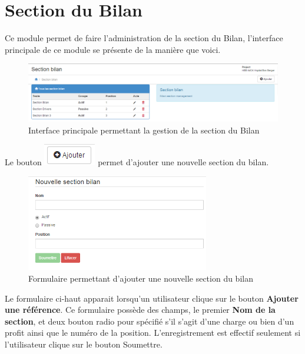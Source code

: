 \documentclass[12pt,a4paper]{report}
\begin{document}
\newpage
\section{Section du Bilan}
Ce module permet de faire l'administration de la section du Bilan, l'interface principale de ce module se présente de la manière que voici.

\begin{figure}[h]
\begin{center}
\includegraphics[width=14cm]{pic/SectionBilan.png}
\end{center}
\caption{Interface principale permettant la gestion de la section du Bilan}
\label{Interface principale permettant la gestion de la section du Bilan}
\end{figure}

Le bouton \includegraphics[scale=0.7]{pic/AddNewStore.png} permet d'ajouter une nouvelle section du bilan.

\begin{figure}[h]
\begin{center}
\includegraphics[width=8cm]{pic/NouvelleSectionBilan.png}
\end{center}
\caption{Formulaire permettant d'ajouter une nouvelle section du bilan}
\label{Formulaire permettant d'ajouter une nouvelle section du bilan}
\end{figure}

Le formulaire ci-haut apparait lorsqu'un utilisateur clique sur le bouton \textbf{Ajouter une référence}. Ce formulaire possède des champs, le premier \textbf{Nom de la section}, et deux bouton radio pour spécifié s'il s'agit d'une charge ou bien d'un profit ainsi que le numéro de la position.
L'enregistrement est effectif seulement si l'utilisateur clique sur le bouton Soumettre.
\end{document}
